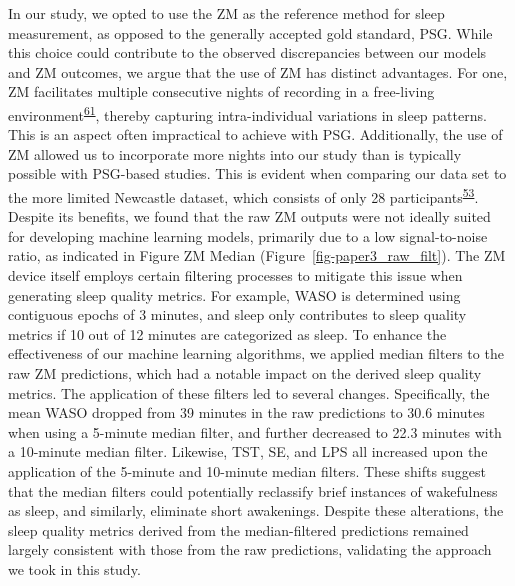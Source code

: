 \documentclass[
  9pt,
]{scrbook}
\begin{document}
In our study, we opted to use the ZM as the reference method for sleep
measurement, as opposed to the generally accepted gold standard, PSG.
While this choice could contribute to the observed discrepancies between
our models and ZM outcomes, we argue that the use of ZM has distinct
advantages. For one, ZM facilitates multiple consecutive nights of
recording in a free-living
environment\textsuperscript{\protect\hyperlink{ref-pedersen_self-administered_2021}{61}},
thereby capturing intra-individual variations in sleep patterns. This is
an aspect often impractical to achieve with PSG. Additionally, the use
of ZM allowed us to incorporate more nights into our study than is
typically possible with PSG-based studies. This is evident when
comparing our data set to the more limited Newcastle dataset, which
consists of only 28
participants\textsuperscript{\protect\hyperlink{ref-hees_novel_2015}{53}}.
Despite its benefits, we found that the raw ZM outputs were not ideally
suited for developing machine learning models, primarily due to a low
signal-to-noise ratio, as indicated in Figure ZM Median
(Figure~\ref{fig-paper3_raw_filt}). The ZM device itself employs certain
filtering processes to mitigate this issue when generating sleep quality
metrics. For example, WASO is determined using contiguous epochs of 3
minutes, and sleep only contributes to sleep quality metrics if 10 out
of 12 minutes are categorized as sleep. To enhance the effectiveness of
our machine learning algorithms, we applied median filters to the raw ZM
predictions, which had a notable impact on the derived sleep quality
metrics. The application of these filters led to several changes.
Specifically, the mean WASO dropped from 39 minutes in the raw
predictions to 30.6 minutes when using a 5-minute median filter, and
further decreased to 22.3 minutes with a 10-minute median filter.
Likewise, TST, SE, and LPS all increased upon the application of the
5-minute and 10-minute median filters. These shifts suggest that the
median filters could potentially reclassify brief instances of
wakefulness as sleep, and similarly, eliminate short awakenings. Despite
these alterations, the sleep quality metrics derived from the
median-filtered predictions remained largely consistent with those from
the raw predictions, validating the approach we took in this study.
\end{document}
